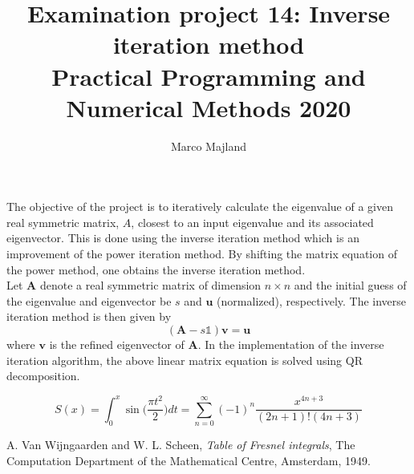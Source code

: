 \documentclass{article}
\title{Examination project 14: Inverse iteration method\\ \small Practical Programming and Numerical Methods 2020}
\author{Marco Majland}
\begin{document}
	\maketitle
	\noindent
	The objective of the project is to iteratively calculate the eigenvalue of a given real symmetric matrix, $A$, closest to an input eigenvalue and its associated eigenvector. This is done using the inverse iteration method which is an improvement of the power iteration method. By shifting the matrix equation of the power method, one obtains the inverse iteration method.\\
	Let $\mathbf{A}$ denote a real  symmetric matrix of dimension $n\times n$ and the initial guess of the eigenvalue and eigenvector be $s$ and $\mathbf{u}$ (normalized), respectively. The inverse iteration method is then given by
	\begin{equation}
		(\mathbf{A} - s\mathbb{1})\mathbf{v} = \mathbf{u}
	\end{equation}
	where $\mathbf{v}$ is the refined eigenvector of $\mathbf{A}$. In the implementation of the inverse iteration algorithm, the above linear matrix equation is solved using QR decomposition.
	
	\begin{equation}
		S(x) = \int_{0}^{x}\sin\Big(\frac{\pi t^2}{2}\Big)dt = \sum_{n = 0}^{\infty}(-1)^{n}\frac{x^{4n+3}}{(2n+1)!(4n+3)}
	\end{equation}
	
	
\begin{thebibliography}{9}
	A. Van Wijngaarden and W. L. Scheen,
	\textit{Table of Fresnel integrals},
	The Computation Department of the Mathematical Centre, Amsterdam,
	1949.
\end{thebibliography}
\end{document}
